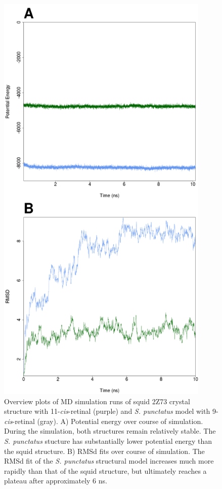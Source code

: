 \begin{figure}[hb]
  \includegraphics[width=4in]{./Chapter_RhodStruct/img/TpSp_mdoutRMS.png}
  \caption[MD summary plots]{Overview plots of MD simulation runs of squid 2Z73 crystal structure with 11-\textit{cis}-retinal (purple) and \textit{S. punctatus} model with 9-\textit{cis}-retinal (gray). A) Potential energy over course of simulation. During the simulation, both structures remain relatively stable. The \textit{S. punctatus} stucture has substantially lower potential energy than the squid structure. B) RMSd fits over course of simulation. The RMSd fit of the \textit{S. punctatus} structural model increases much more rapidly than that of the squid structure, but ultimately reaches a plateau after approximately 6 ns.}
  \label{fig:ChRhodS_MDEnergyRMSD}
\end{figure}
